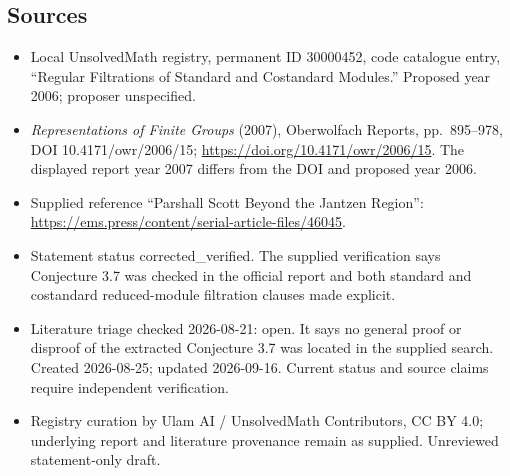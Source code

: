 \documentclass[11pt]{article}
\begin{document}
\subsection{Sources}
\begin{itemize}
\item Local UnsolvedMath registry, permanent ID 30000452, code catalogue entry, ``Regular Filtrations of Standard and Costandard Modules.'' Proposed year 2006; proposer unspecified.
\item \emph{Representations of Finite Groups} (2007), Oberwolfach Reports, pp.\ 895--978, DOI 10.4171/owr/2006/15; \url{https://doi.org/10.4171/owr/2006/15}. The displayed report year 2007 differs from the DOI and proposed year 2006.
\item Supplied reference ``Parshall Scott Beyond the Jantzen Region'': \url{https://ems.press/content/serial-article-files/46045}.
\item Statement status corrected\_verified. The supplied verification says Conjecture 3.7 was checked in the official report and both standard and costandard reduced-module filtration clauses made explicit.
\item Literature triage checked 2026-08-21: open. It says no general proof or disproof of the extracted Conjecture 3.7 was located in the supplied search. Created 2026-08-25; updated 2026-09-16. Current status and source claims require independent verification.
\item Registry curation by Ulam AI / UnsolvedMath Contributors, CC BY 4.0; underlying report and literature provenance remain as supplied. Unreviewed statement-only draft.
\end{itemize}
\end{document}
